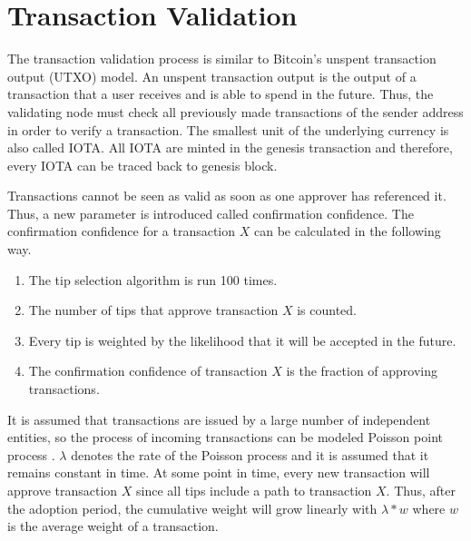 \section{Transaction Validation}\label{transaction-validation}

The transaction validation process is similar to Bitcoin's unspent transaction output (UTXO) model. An unspent transaction output is the output of a transaction that a user receives and is able to spend in the future. Thus, the validating node must check all previously made transactions of the sender address in order to verify a transaction. The smallest unit of the underlying currency is also called IOTA. All IOTA are minted in the genesis transaction and therefore, every IOTA can be traced back to genesis block. 

Transactions cannot be seen as valid as soon as one approver has referenced it. Thus, a new parameter is introduced called confirmation confidence. The confirmation confidence for a transaction $X$ can be calculated in the following way.

\begin{enumerate}
    \item The tip selection algorithm is run 100 times.
    \item The number of tips that approve transaction $X$ is counted.
    \item Every tip is weighted by the likelihood that it will be accepted in the future.
    \item The confirmation confidence of transaction $X$ is the fraction of approving transactions.
\end{enumerate}

It is assumed that transactions are issued by a large number of independent entities, so the process of incoming transactions can be modeled Poisson point process \cite{the-tangle}. $\lambda$ denotes the rate of the Poisson process and it is assumed that it remains constant in time. At some point in time, every new transaction will approve transaction $X$ since all tips include a path to transaction $X$. Thus, after the adoption period, the cumulative weight will grow linearly with $\lambda * w$ where $w$ is the average weight of a transaction.


